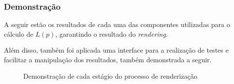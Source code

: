         \subsubsection{Demonstração}
            A seguir estão os resultados de cada uma das componentes utilizadas para o cálculo de $L(p)$, garantindo o resultado do \textit{rendering}. 
            
            Além disso, também foi aplicada uma interface para a realização de testes e facilitar a manipulação dos resultados, também demonstrada a seguir.

            \begin{figure}[!ht]
                \centering
                \hfill
                \hfill
                \hfill
                \hfill
                \caption{Demonstração de cada estágio do processo de renderização}
            \end{figure}

